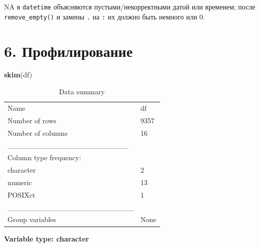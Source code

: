 \documentclass[
]{article}
\newenvironment{Shaded}{\begin{snugshade}}{\end{snugshade}}
\newcommand{\FunctionTok}[1]{\textcolor[rgb]{0.13,0.29,0.53}{\textbf{#1}}}
\newcommand{\NormalTok}[1]{#1}
\begin{document}
NA в \texttt{datetime} объясняются пустыми/некорректными датой или
временем; после \texttt{remove\_empty()} и замены \texttt{.} на
\texttt{:} их должно быть немного или 0.

\section{6.
Профилирование}\label{ux43fux440ux43eux444ux438ux43bux438ux440ux43eux432ux430ux43dux438ux435}

\begin{Shaded}
\begin{Highlighting}[]
\FunctionTok{skim}\NormalTok{(df)}
\end{Highlighting}
\end{Shaded}

\begin{longtable}[]{@{}ll@{}}
\caption{Data summary}\tabularnewline
\toprule\noalign{}
\endfirsthead
\endhead
\bottomrule\noalign{}
\endlastfoot
Name & df \\
Number of rows & 9357 \\
Number of columns & 16 \\
\_\_\_\_\_\_\_\_\_\_\_\_\_\_\_\_\_\_\_\_\_\_\_ & \\
Column type frequency: & \\
character & 2 \\
numeric & 13 \\
POSIXct & 1 \\
\_\_\_\_\_\_\_\_\_\_\_\_\_\_\_\_\_\_\_\_\_\_\_\_ & \\
Group variables & None \\
\end{longtable}

\textbf{Variable type: character}
\end{document}
